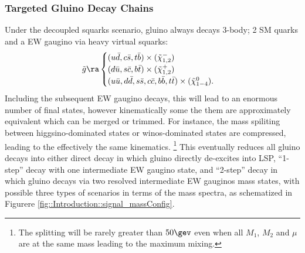 

\clearpage
\subsubsection{Targeted Gluino Decay Chains} \label{sec::Introduction::targetModels}
Under the decoupled squarks scenario, gluino always decays 3-body; 2 SM quarks and a EW gaugino via heavy virtual squarks:
\begin{align}
\tg \ra 
  \begin{cases}
    (u\bar{d}, c\bar{s}, t\bar{b}) \times (\tilde{\chi}_{1,2}^{-}) \nn \\
    (d\bar{u}, s\bar{c}, b\bar{t}) \times (\tilde{\chi}_{1,2}^{+})  \nn \\
    (u\bar{u},d\bar{d},s\bar{s},c\bar{c},b\bar{b},t\bar{t}) \times (\tilde{\chi}_{1-4}^{0}). \nn 
  \end{cases}
\label{eq::gluinoDecays}
\end{align}
Including the subsequent EW gaugino decays, this will lead to an enormous number of final states,
however kinematically some the them are approximately equivalent which can be merged or trimmed. 
For instance, the mass spiliting between higgsino-dominated states or winos-dominated states are compressed, leading to the effectively the same kinematics. 
\footnote{The splitting will be rarely greater than $50\gev$ even when all $M_1$, $M_2$ and $\mu$ are at the same mass leading to the maximum mixing.} 
This eventually reduces all gluino decays into either direct decay in which gluino directly de-excites into LSP, ``1-step'' decay with one intermediate EW gaugino state, and ``2-step'' decay in which gluino decays via two resolved intermediate EW gauginos mass states, with possible three types of scenarios in terms of the  mass spectra, as schematized in Figurere \ref{fig::Introduction::signal_massConfig}.


